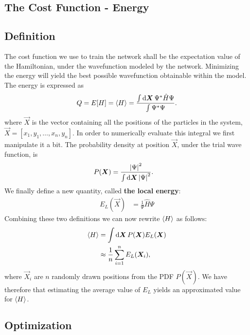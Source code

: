 \documentclass[a4paper, 11pt]{article}
\begin{document}
\begin{multicols}{2}
    \section{The Cost Function - Energy}
    \subsection{Definition}

    The cost function we use to train the network shall be the expectation value
    of the Hamiltonian, under the wavefunction modeled by the network.
    Minimizing the energy will yield the best possible wavefunction obtainable
    within the model. The energy is expressed as
    \begin{align}
        Q = E[H] = \expval{H} = \frac{\int \dd{\bm X} \Psi^* \hat H \Psi}{\int
        \Psi^*\Psi}.
    \end{align}
    where $\vec X$ is the vector containing all the positions of the particles in
    the system, $\vec X = [x_1, y_1,\dots, x_n, y_n]$.
    In order to numerically evaluate this integral we first manipulate it a bit.
    The probability density at position $\vec X$, under the trial wave function, is
    \begin{align}
        P(\bm X) &= \frac{\abs{\Psi}^2}{\int \dd{\bm X}\abs{\Psi}^2}.
    \end{align}
    We finally define a new quantity, called \textbf{the local energy}:
    \begin{align}
        E_L(\vec X) &= \frac{1}{\Psi}\hat H\Psi\label{eq:E_L}
    \end{align}
    Combining these two definitions we can now rewrite $\expval{H}$ as follows:
    \begin{align}
        \begin{split}
            \expval{H} &= \int \dd{\bm X} P(\bm X) E_L(\bm X)\\
            &\approx
            \frac{1}{n}\sum_{i=1}^n E_L(\bm X_i),
        \end{split}\label{eq:the-objective}
    \end{align}
    where $\vec X_i$ are $n$ randomly drawn positions from the PDF $P(\vec X)$.
    We have therefore that estimating the average value of $E_L$ yields an
    approximated value for $\expval{H}$. 
    
    \subsection{Optimization}


\end{multicols}
\end{document}
